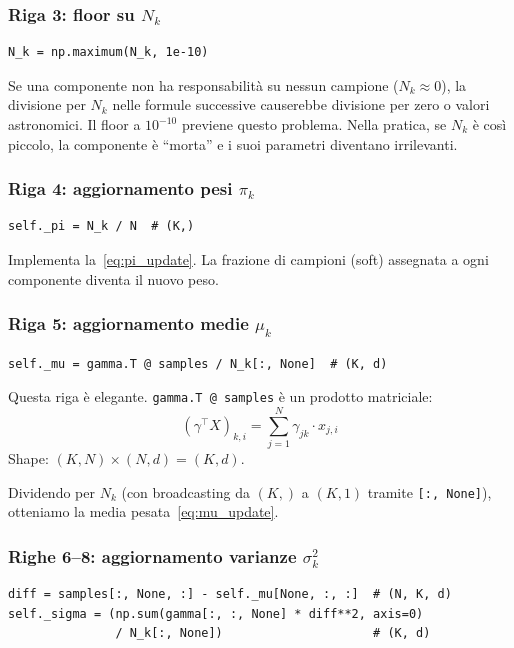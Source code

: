 \documentclass[11pt,a4paper]{article}
\begin{document}
\subsubsection{Riga 3: floor su $N_k$}
\begin{lstlisting}
N_k = np.maximum(N_k, 1e-10)
\end{lstlisting}

\begin{warnbox}
Se una componente non ha responsabilità su nessun campione
($N_k \approx 0$), la divisione per $N_k$ nelle formule successive
causerebbe divisione per zero o valori astronomici. Il floor a
$10^{-10}$ previene questo problema. Nella pratica, se $N_k$ è
così piccolo, la componente è ``morta'' e i suoi parametri diventano
irrilevanti.
\end{warnbox}

\subsubsection{Riga 4: aggiornamento pesi $\pi_k$}
\begin{lstlisting}
self._pi = N_k / N  # (K,)
\end{lstlisting}
Implementa la~\eqref{eq:pi_update}. La frazione di campioni (soft)
assegnata a ogni componente diventa il nuovo peso.

\subsubsection{Riga 5: aggiornamento medie $\mu_k$}
\begin{lstlisting}
self._mu = gamma.T @ samples / N_k[:, None]  # (K, d)
\end{lstlisting}

Questa riga è elegante. \texttt{gamma.T @ samples} è un prodotto
matriciale:
\[
  (\gamma^\top X)_{k,i} = \sum_{j=1}^{N} \gamma_{jk} \cdot x_{j,i}
\]
Shape: $(K, N) \times (N, d) = (K, d)$.

Dividendo per $N_k$ (con broadcasting da $(K,)$ a $(K,1)$ tramite
\texttt{[:, None]}), otteniamo la media pesata~\eqref{eq:mu_update}.

\subsubsection{Righe 6--8: aggiornamento varianze $\sigma_k^2$}
\begin{lstlisting}
diff = samples[:, None, :] - self._mu[None, :, :]  # (N, K, d)
self._sigma = (np.sum(gamma[:, :, None] * diff**2, axis=0)
               / N_k[:, None])                     # (K, d)
\end{lstlisting}
\end{document}
